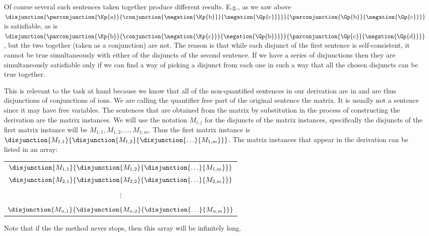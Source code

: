 Of course several such sentences taken together produce different results. E.g., as we saw above $\disjunction{\parconjunction{\Kp{\constant{a}}}{\conjunction{\negation{\Kp{\constant{b}}}}{\negation{\Gp{\constant{c}}}}}}{\parconjunction{\Gp{\constant{b}}}{\negation{\Gp{\constant{c}}}}}$ is satisfiable, as is $\disjunction{\parconjunction{\Kp{\constant{b}}}{\conjunction{\negation{\Kp{\constant{c}}}}{\negation{\Gp{\constant{b}}}}}}{\parconjunction{\Gp{\constant{c}}}{\negation{\Gp{\constant{d}}}}}$, but the two together (taken as a conjunction) are not.
The reason is that while each disjunct of the first sentence is self-consistent, it cannot be true simultaneously with either of the disjuncts of the second sentence. If we have a series of disjunctions then they are simultaneously satisfiable only if we can find a way of picking a disjunct from each one in such a way that all the chosen disjuncts can be true together.

This is relevant to the task at hand because we know that all of the non-quantified sentences in our derivation are in  and are thus disjunctions of conjunctions of ions.
We are calling the quantifier free part of the original sentence the matrix.
It is usually not a sentence since it may have free variables. 
The sentences that are obtained from the matrix by substitution in the process of constructing the derivation are the matrix instances. 
We will use the notation $M_{i,j}$ for the disjuncts of the matrix instances, specifically the disjuncts of the first matrix instance will be $M_{1,1},M_{1,2},\ldots,M_{1,m}$.
Thus the first matrix instance is $\disjunction{M_{1,1}}{\disjunction{M_{1,2}}{\disjunction{\ldots}{M_{1,m}}}}$.
The matrix instances that appear in the derivation can be listed in an array:
\begin{center}
\begin{tabular}{ c }
$\disjunction{M_{1,1}}{\disjunction{M_{1,2}}{\disjunction{\ldots}{M_{1,m}}}}$ \\
$\disjunction{M_{2,1}}{\disjunction{M_{2,2}}{\disjunction{\ldots}{M_{2,m}}}}$ \\
\\
\hspace{.5in} $\vdots$ \\
\\
$\disjunction{M_{n,1}}{\disjunction{M_{n,2}}{\disjunction{\ldots}{M_{n,m}}}}$ \\
\end{tabular}
\end{center}
Note that if the the method never stops, then this array will be infinitely long. 


